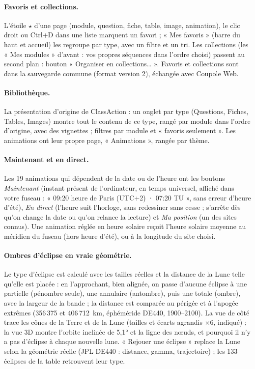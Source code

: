 \paragraph{Favoris et collections.} L'étoile $\star$ d'une page (module, question, fiche, table, image, animation),
le clic droit ou Ctrl+D dans une liste marquent un favori ; « Mes favoris » (barre du haut et accueil) les regroupe
par type, avec un filtre et un tri. Les collections (les « Mes modules » d'avant : vos propres séquences dans l'ordre
choisi) passent au second plan : bouton « Organiser en collections\dots{} ». Favoris et collections sont dans la
sauvegarde commune (format version 2), échangée avec Coupole Web.

\paragraph{Bibliothèque.} La présentation d'origine de ClassAction : un onglet par type (Questions, Fiches, Tables, Images)
montre tout le contenu de ce type, rangé par module dans l'ordre d'origine, avec des vignettes ; filtres par module et
« favoris seulement ». Les animations ont leur propre page, « Animations », rangée par thème.

\paragraph{Maintenant et en direct.} Les 19 animations qui dépendent de la date ou de l'heure ont les boutons
\emph{Maintenant} (instant présent de l'ordinateur, en temps universel, affiché dans votre fuseau : « 09:20 heure de
Paris (UTC+2) · 07:20 TU », sans erreur d'heure d'été), \emph{En direct} (l'heure suit l'horloge, sans redessiner
sans cesse ; s'arrête dès qu'on change la date ou qu'on relance la lecture) et \emph{Ma position} (un des sites
connus). Une animation réglée en heure solaire reçoit l'heure solaire moyenne au méridien du fuseau (hors heure
d'été), ou à la longitude du site choisi.

\paragraph{Ombres d'éclipse en vraie géométrie.} Le type d'éclipse est calculé avec les tailles réelles et la distance
de la Lune telle qu'elle est placée : en l'approchant, bien alignée, on passe d'aucune éclipse à une partielle
(pénombre seule), une annulaire (antombre), puis une totale (ombre), avec la largeur de la bande ; la distance est
comparée au périgée et à l'apogée extrêmes (356\,375 et 406\,712~km, éphéméride DE440, 1900--2100). La vue de côté
trace les cônes de la Terre et de la Lune (tailles et écarts agrandis $\times$6, indiqué) ; la vue 3D montre l'orbite
inclinée de 5,1° et la ligne des nœuds, et pourquoi il n'y a pas d'éclipse à chaque nouvelle lune. « Rejouer une
éclipse » replace la Lune selon la géométrie réelle (JPL DE440 : distance, gamma, trajectoire) ; les 133 éclipses de
la table retrouvent leur type.

